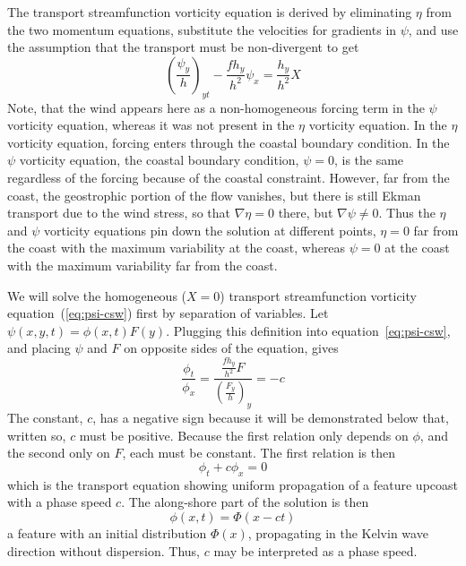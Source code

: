\documentclass[11pt]{report}
\numberwithin{equation}{section}
\begin{document}
The transport streamfunction vorticity equation is derived by eliminating $\eta$ from the two momentum equations, substitute the velocities for gradients in $\psi$, and use the assumption that the transport must be non-divergent to get
\begin{equation}
    \label{eq:psi-csw}
    \left( \frac{\psi_y}{h} \right)_{y t} - \frac{f h_y}{h^2}\psi_x = \frac{h_y}{h^2}X
\end{equation}
Note, that the wind appears here as a non-homogeneous forcing term in the $\psi$ vorticity equation, whereas it was not present in the $\eta$ vorticity equation.  In the $\eta$ vorticity equation, forcing enters through the coastal boundary condition.  In the $\psi$ vorticity equation, the coastal boundary condition, $\psi=0$, is the same regardless of the forcing because of the coastal constraint.  However, far from the coast, the geostrophic portion of the flow vanishes, but there is still Ekman transport due to the wind stress, so that $\nabla\eta = 0$ there, but $\nabla\psi \ne 0$.  Thus the $\eta$ and $\psi$ vorticity equations pin down the solution at different points, $\eta=0$ far from the coast with the maximum variability at the coast, whereas $\psi=0$ at the coast with the maximum variability far from the coast.

We will solve the homogeneous ($X=0$) transport streamfunction vorticity equation~(\ref{eq:psi-csw}) first by separation of variables.  Let $\psi(x, y, t) = \phi(x, t) F(y)$.  Plugging this definition into equation~\ref{eq:psi-csw}, and placing $\psi$ and $F$ on opposite sides of the equation, gives
\begin{equation}
    \frac{\phi_t}{\phi_x} =  \frac{\frac{f h_y}{h^2} F }{\left( \frac{F_y}{h}  \right)_y} = -c
\end{equation}
The constant, $c$, has a negative sign because it will be demonstrated below that, written so, $c$ must be positive.  Because the first relation only depends on $\phi$, and the second only on $F$, each must be constant.  The first relation is then
\begin{equation}
    \phi_t + c\phi_x = 0
\end{equation}
which is the transport equation showing uniform propagation of a feature upcoast with a phase speed $c$.  The along-shore part of the solution is then
\begin{equation}
    \phi(x, t) = \Phi(x - ct)
\end{equation}
a feature with an initial distribution $\Phi(x)$, propagating in the Kelvin wave direction without dispersion.  Thus, $c$ may be interpreted as a phase speed.
\end{document}
